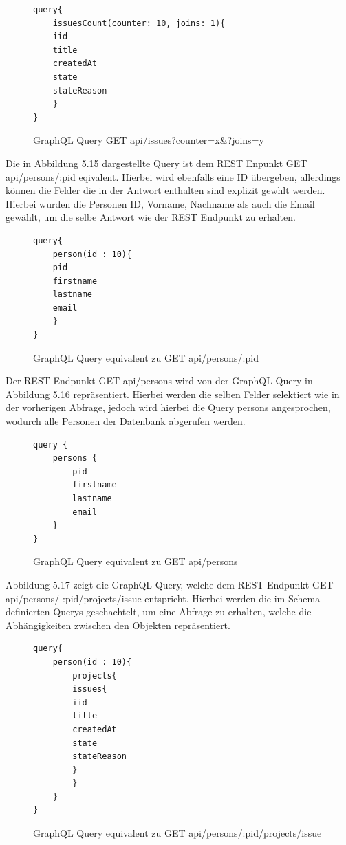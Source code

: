 \begin{figure}[H]
\begin{center}
\begin{BVerbatim}
query{
    issuesCount(counter: 10, joins: 1){
	iid
	title 
	createdAt 
	state 
	stateReason
    }
}
\end{BVerbatim}
\end{center}
\caption{GraphQL Query GET api/issues?counter=x\&?joins=y}
\end{figure}
\noindent
Die in Abbildung 5.15 dargestellte Query ist dem REST Enpunkt GET api/persons/:pid eqivalent. Hierbei wird ebenfalls eine ID übergeben, allerdings können die Felder die in der Antwort enthalten sind explizit gewhlt werden. Hierbei wurden die Personen ID, Vorname, Nachname als auch die Email gewählt, um die selbe Antwort wie der REST Endpunkt zu erhalten. 
\begin{figure}[H]
\begin{center}
\begin{BVerbatim}
query{
    person(id : 10){
	pid
	firstname
	lastname
	email
    }
}
\end{BVerbatim}
\end{center}
\caption{GraphQL Query equivalent zu GET api/persons/:pid}
\end{figure}
\noindent
Der REST Endpunkt GET api/persons wird von der GraphQL Query in Abbildung 5.16 repräsentiert. Hierbei werden die selben Felder selektiert wie in der vorherigen Abfrage, jedoch wird hierbei die Query persons angesprochen, wodurch alle Personen der Datenbank abgerufen werden.
\begin{figure}[H]
\begin{center}
\begin{BVerbatim}
query {
    persons {
        pid
        firstname
        lastname
        email
    }
}
\end{BVerbatim}
\end{center}
\caption{GraphQL Query equivalent zu GET api/persons}
\end{figure}
\noindent
Abbildung 5.17 zeigt die GraphQL Query, welche dem REST Endpunkt GET api/persons/ :pid/projects/issue entspricht. Hierbei werden die im Schema definierten Querys geschachtelt, um eine Abfrage zu erhalten, welche die Abhängigkeiten zwischen den Objekten repräsentiert.
\begin{figure}[H]
\begin{center}
\begin{BVerbatim}
query{
    person(id : 10){
        projects{
	    issues{
		iid
		title
		createdAt
		state
		stateReason
	    }
        }
    }
}
\end{BVerbatim}
\end{center}
\caption{GraphQL Query equivalent zu GET api/persons/:pid/projects/issue}
\end{figure}
